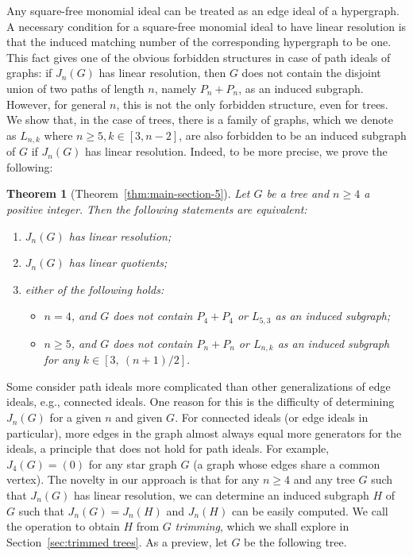 \documentclass{amsart}
\newtheorem{theorem}{Theorem}[section]
\theoremstyle{remark}
\theoremstyle{definition}
\begin{document}
    Any square-free monomial ideal can be treated as an edge ideal of a hypergraph. %
    A necessary condition for a square-free monomial ideal to have linear resolution is that the induced matching number of the corresponding hypergraph to be one. This fact gives one of the obvious forbidden structures in case of path ideals of graphs: if $J_n(G)$ has linear resolution, then $G$ does not contain the disjoint union of two paths of length $n$, namely $P_n+P_n$, as an induced subgraph. However, for general $n$, this is not the only forbidden structure, even for trees.
     We show that, in the case of trees, there is a family of graphs, which we denote as $L_{n,k}$ where $n\geq 5, k\in [3,n-2]$, are also forbidden to be an induced subgraph of $G$ if $J_n(G)$ has linear resolution. Indeed, to be more precise, we prove the following:  
    

    \begin{theorem}[{Theorem~\ref{thm:main-section-5}}]\label{thm:main}
        Let $G$ be a tree and $n\geq 4$ a positive integer. Then the following statements are equivalent:
        \begin{enumerate}
            \item $J_n(G)$ has linear resolution;
            \item $J_n(G)$ has linear quotients;
            \item either of the following holds:
            \begin{itemize}
                \item[(i)] $n=4$, and  $G$ does not contain $P_4+P_4$ or $L_{5,3}$ as an induced subgraph;
                \item[(ii)] $n\geq 5$, and $G$ does not contain $P_n+P_n$ or $L_{n,k}$ as an induced subgraph for  any $k\in [3,\ (n+1)/2].$
            \end{itemize}
        \end{enumerate}
    \end{theorem}
    

    
   Some consider path ideals more complicated than other generalizations of edge ideals, e.g., connected ideals. One reason for this is the difficulty of determining $J_n(G)$ for a given $n$ and given $G$. For connected ideals (or edge ideals in particular), more edges in the graph almost always equal more generators for the ideals, a principle that does not hold for path ideals. For example, $J_4(G)=(0)$ for any star graph $G$ (a graph whose edges share a common vertex). The novelty in our approach is that for any $n\geq 4$ and any tree $G$ such that $J_n(G)$ has linear resolution, we can determine an induced subgraph $H$ of $G$ such that $J_n(G)=J_n(H)$ and $J_n(H)$ can be easily computed. We call the operation to obtain $H$ from $G$ \emph{trimming}, which we shall explore in Section~\ref{sec:trimmed trees}. As a preview, let $G$ be the following tree.
   
\end{document}
